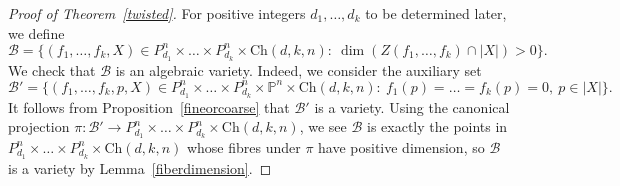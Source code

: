 \documentclass[11pt]{article}
\theoremstyle{definition}
\begin{document}
\begin{proof}[Proof of Theorem~\ref{twisted}]
    For positive integers $d_1,\dots,d_k$ to be determined later, we define \begin{equation*}
        \mathcal{B} = \{ (f_1,\ldots,f_k,X)\in P^{n}_{d_1}\times\dots\times P^n_{d_k}\times \text{Ch}(d,k,n) :~ \dim ( Z(f_1,\dots,f_k) \cap |X| )>0 \}.
    \end{equation*} We check that $\mathcal{B}$ is an algebraic variety. Indeed, we consider the auxiliary set \begin{equation*}
        \mathcal{B}' = \{ (f_1,\ldots,f_k,p,X)\in P^{n}_{d_1}\times\dots\times P^n_{d_k} \times \mathbb{P}^n \times \text{Ch}(d,k,n) :~ f_1(p)=\dots=f_k(p)=0,~ p \in |X| \}.
    \end{equation*} It follows from Proposition~\ref{fineorcoarse} that $\mathcal{B}'$ is a variety. Using the canonical projection $\pi: \mathcal{B}' \to P^{n}_{d_1}\times\dots\times P^n_{d_k}\times \text{Ch}(d,k,n)$, we see $\mathcal{B}$ is exactly the points in $P^{n}_{d_1}\times\dots\times P^n_{d_k}\times \text{Ch}(d,k,n)$ whose fibres under $\pi$ have positive dimension, so $\mathcal{B}$ is a variety by Lemma~\ref{fiberdimension}.


\end{proof}
\end{document}

